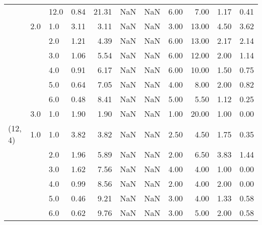 \begin{tabular}{lllrrrrrrrr}
       &     & 12.0 &      0.84 &      21.31 &               NaN &                NaN & 6.00 &   7.00 &             1.17 &                         0.41 \\
       & 2.0 & 1.0  &      3.11 &       3.11 &               NaN &                NaN & 3.00 &  13.00 &             4.50 &                         3.62 \\
       &     & 2.0  &      1.21 &       4.39 &               NaN &                NaN & 6.00 &  13.00 &             2.17 &                         2.14 \\
       &     & 3.0  &      1.06 &       5.54 &               NaN &                NaN & 6.00 &  12.00 &             2.00 &                         1.14 \\
       &     & 4.0  &      0.91 &       6.17 &               NaN &                NaN & 6.00 &  10.00 &             1.50 &                         0.75 \\
       &     & 5.0  &      0.64 &       7.05 &               NaN &                NaN & 4.00 &   8.00 &             2.00 &                         0.82 \\
       &     & 6.0  &      0.48 &       8.41 &               NaN &                NaN & 5.00 &   5.50 &             1.12 &                         0.25 \\
       & 3.0 & 1.0  &      1.90 &       1.90 &               NaN &                NaN & 1.00 &  20.00 &             1.00 &                         0.00 \\
(12, 4) & 1.0 & 1.0  &      3.82 &       3.82 &               NaN &                NaN & 2.50 &   4.50 &             1.75 &                         0.35 \\
       &     & 2.0  &      1.96 &       5.89 &               NaN &                NaN & 2.00 &   6.50 &             3.83 &                         1.44 \\
       &     & 3.0  &      1.62 &       7.56 &               NaN &                NaN & 4.00 &   4.00 &             1.00 &                         0.00 \\
       &     & 4.0  &      0.99 &       8.56 &               NaN &                NaN & 2.00 &   4.00 &             2.00 &                         0.00 \\
       &     & 5.0  &      0.46 &       9.21 &               NaN &                NaN & 3.00 &   4.00 &             1.33 &                         0.58 \\
       &     & 6.0  &      0.62 &       9.76 &               NaN &                NaN & 3.00 &   5.00 &             2.00 &                         0.58 \\

\end{tabular}
